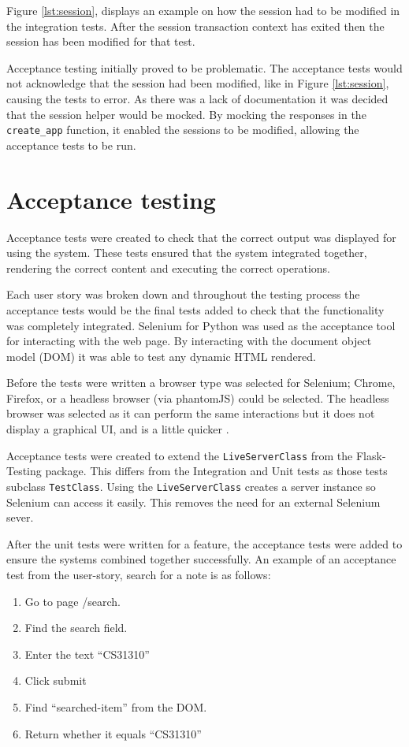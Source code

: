 Figure \ref{lst:session}, displays an example on how the session had to be modified in the integration tests. After the session transaction context has exited then the session has been modified for that test.

Acceptance testing initially proved to be problematic. The acceptance tests would not acknowledge that the session had been modified, like in Figure \ref{lst:session}, causing the tests to error. As there was a lack of documentation it was decided that the session helper would be mocked. By mocking the responses in the \texttt{create\_app} function, it enabled the sessions to be modified, allowing the acceptance tests to be run.
\section{Acceptance testing}
Acceptance tests were created to check that the correct output was displayed for using the system. These tests ensured that the system integrated together, rendering the correct content and executing the correct operations.

Each user story was broken down and throughout the testing process the acceptance tests would be the final tests added to check that the functionality was completely integrated. Selenium for Python \cite{citeulike:14020625} was used as the acceptance tool for interacting with the web page. By interacting with the document object model (DOM) it was able to test any dynamic HTML rendered.

Before the tests were written a browser type was selected for Selenium; Chrome, Firefox, or a headless browser (via phantomJS) could be selected. The headless browser was selected as it can perform the same interactions but it does not display a graphical UI, and is a little quicker \cite{citeulike:13983611}.

Acceptance tests were created to extend the \texttt{LiveServerClass} from the Flask-Testing package. This differs from the Integration and Unit tests as those tests subclass \texttt{TestClass}. Using the \texttt{LiveServerClass} creates a server instance so Selenium can access it easily. This removes the need for an external Selenium sever.

After the unit tests were written for a feature, the acceptance tests were added to ensure the systems combined together successfully. An example of an acceptance test from the user-story, search for a note is as follows:
\begin{enumerate}
  \item Go to page /search.
  \item Find the search field.
  \item Enter the text ``CS31310''
  \item Click submit
  \item Find ``searched-item'' from the DOM.
  \item Return whether it equals ``CS31310''
\end{enumerate}

